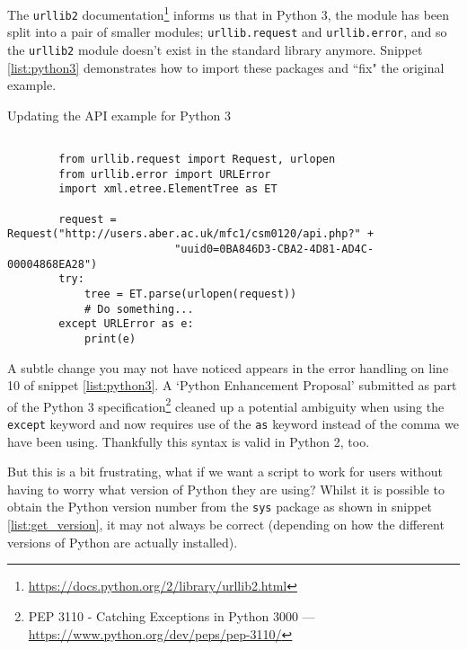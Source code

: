 \documentclass[a4paper]{article}
\begin{document}
The \texttt{urllib2} documentation\footnote{{\href{https://docs.python.org/2/library/urllib2.html}{https://docs.python.org/2/library/urllib2.html}}} informs us that in Python 3, the module has been split into a
pair of smaller modules; \texttt{urllib.request} and \texttt{urllib.error}, and so
the \texttt{urllib2} module doesn't exist in the standard library anymore.
Snippet \ref{list:python3} demonstrates how to import these packages and ``fix"
the original example.

\begin{listing}[H]
    \caption[]{Updating the API example for Python 3}
    \label{list:python3}
    \begin{verbatim}

        from urllib.request import Request, urlopen
        from urllib.error import URLError
        import xml.etree.ElementTree as ET

        request = Request("http://users.aber.ac.uk/mfc1/csm0120/api.php?" +
                          "uuid0=0BA846D3-CBA2-4D81-AD4C-00004868EA28")
        try:
            tree = ET.parse(urlopen(request))
            # Do something...
        except URLError as e:
            print(e)

    \end{verbatim}
\end{listing}

\pagebreak

A subtle change you may not have noticed appears in the error handling on line
10 of snippet \ref{list:python3}. A `Python Enhancement Proposal' submitted as part of
the Python 3 specification\footnote{PEP 3110 - Catching Exceptions in Python 3000 --- {\href{https://www.python.org/dev/peps/pep-3110/}{https://www.python.org/dev/peps/pep-3110/}}}  cleaned up a potential ambiguity
when using the \texttt{except} keyword and now requires use of the \texttt{as}
keyword instead of the comma we have been using. Thankfully this syntax is valid in
Python 2, too.

But this is a bit frustrating, what if we want a script to work for users without
having to worry what version of Python they are using? Whilst it is possible to
obtain the Python version number from the \texttt{sys} package as shown in
snippet \ref{list:get_version}, it may not always be correct (depending on how
the different versions of Python are actually installed).
\end{document}
